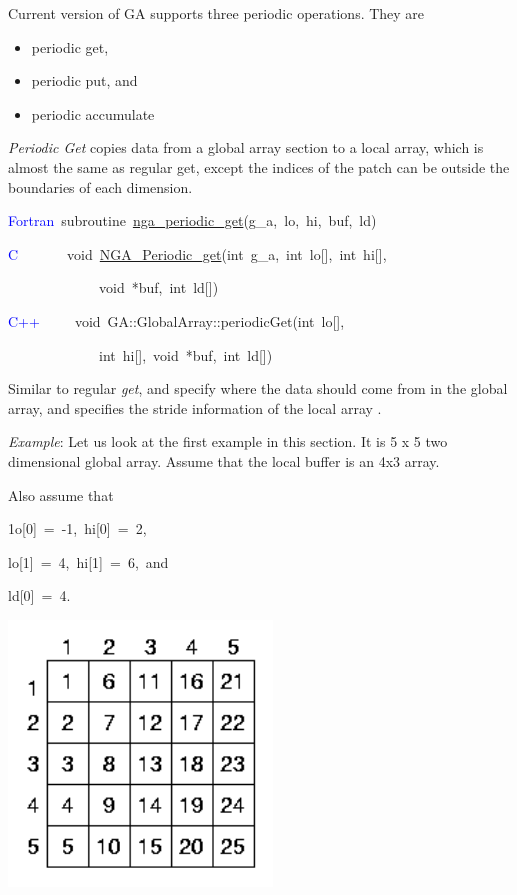 Current version of GA supports three periodic operations. They are
\begin{itemize}
\item periodic get, 
\item periodic put, and 
\item periodic accumulate
\end{itemize}
\emph{Periodic Get }copies data from a global array section to a local
array, which is almost the same as regular get, except the indices
of the patch can be outside the boundaries of each dimension.
\begin{lyxcode}
\textcolor{blue}{Fortran}~subroutine~\href{http://www.emsl.pnl.gov/docs/global/ga_ops.html\#ga_periodic_get}{nga\_{}periodic\_{}get}(g\_a,~lo,~hi,~buf,~ld)~

\textcolor{blue}{C}~~~~~~~void~\href{http://www.emsl.pnl.gov/docs/global/c_nga_ops.html\#ga_periodic_get}{NGA\_{}Periodic\_{}get}(int~g\_a,~int~lo{[}{]},~int~hi{[}{]},~

~~~~~~~~~~~~~void~{*}buf,~int~ld{[}{]})~

\textcolor{blue}{C++}~~~~~void~GA::GlobalArray::periodicGet(int~lo{[}{]},~

~~~~~~~~~~~~~int~hi{[}{]},~void~{*}buf,~int~ld{[}{]})
\end{lyxcode}
Similar to regular \emph{get}, \texttt{} and \texttt{}
specify where the data should come from in the global array, and \texttt{}
specifies the stride information of the local array \texttt{}.

\emph{Example}: Let us look at the first example in this section.
It is 5 x 5 two dimensional global array. Assume that the local buffer
is an 4x3 array. 

Also assume that
\begin{lyxcode}
1o{[}0{]}~=~-1,~hi{[}0{]}~=~2,~

lo{[}1{]}~=~4,~hi{[}1{]}~=~6,~and~

ld{[}0{]}~=~4.
\end{lyxcode}
\includegraphics[width=7cm]{periodic1}

